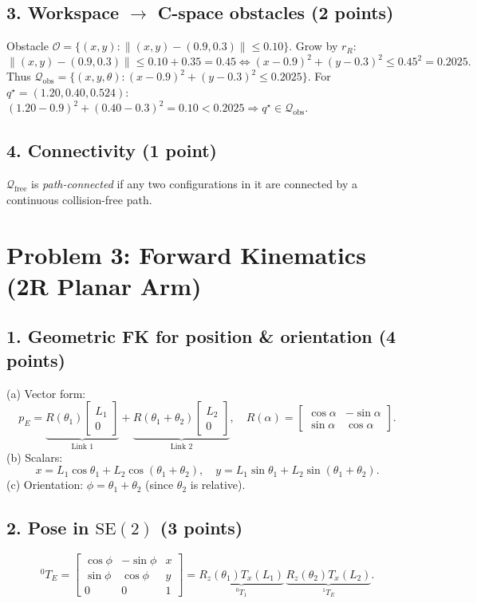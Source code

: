 \documentclass[11pt]{article}
\begin{document}
\subsection*{3. Workspace $\to$ C-space obstacles (2 points)}
Obstacle
\(
\mathcal{O}=\{(x,y):\|(x,y)-(0.9,0.3)\|\le 0.10\}.
\)
Grow by $r_R$:
\[
\|(x,y)-(0.9,0.3)\| \le 0.10+0.35=0.45
\iff
(x-0.9)^2+(y-0.3)^2 \le 0.45^2=0.2025.
\]
Thus
\(
\mathcal{Q}_{\text{obs}}=\{(x,y,\theta): (x-0.9)^2+(y-0.3)^2\le 0.2025\}.
\)
For $q^\star=(1.20,0.40,0.524)$:
$(1.20-0.9)^2+(0.40-0.3)^2=0.10<0.2025\Rightarrow q^\star\in\mathcal{Q}_{\text{obs}}$.

\subsection*{4. Connectivity (1 point)}
$\mathcal{Q}_{\text{free}}$ is \emph{path-connected} if any two configurations in it are connected by a continuous collision-free path.

\section*{Problem 3: Forward Kinematics (2R Planar Arm)}

\subsection*{1. Geometric FK for position \& orientation (4 points)}
(a) Vector form:
\[
p_E =
\underbrace{R(\theta_1)\!\begin{bmatrix}L_1\\0\end{bmatrix}}_{\text{Link 1}}
+
\underbrace{R(\theta_1+\theta_2)\!\begin{bmatrix}L_2\\0\end{bmatrix}}_{\text{Link 2}},
\quad
R(\alpha)=\begin{bmatrix}\cos\alpha&-\sin\alpha\\ \sin\alpha&\cos\alpha\end{bmatrix}.
\]
(b) Scalars:
\[
x=L_1\cos\theta_1+L_2\cos(\theta_1+\theta_2),\quad
y=L_1\sin\theta_1+L_2\sin(\theta_1+\theta_2).
\]
(c) Orientation: $\phi=\theta_1+\theta_2$ (since $\theta_2$ is relative).

\subsection*{2. Pose in $\text{SE}(2)$ (3 points)}
\[
{}^{0}\!T_{E}=
\begin{bmatrix}
\cos\phi&-\sin\phi&x\\
\sin\phi& \cos\phi&y\\
0&0&1
\end{bmatrix}
=
\underbrace{R_z(\theta_1)T_x(L_1)}_{^{0}\!T_1}\,
\underbrace{R_z(\theta_2)T_x(L_2)}_{^{1}\!T_E}.
\]
\end{document}
